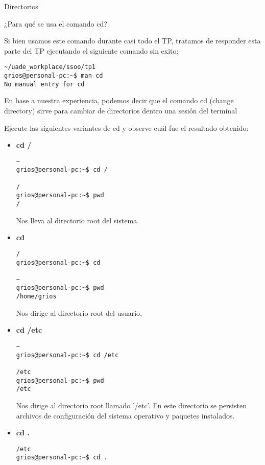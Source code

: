 \begin{section}{Directorios}

\begin{quoting}
¿Para qué se usa el comando cd?
\end{quoting}

Si bien usamos este comando durante casi todo el TP, tratamos de responder esta parte del TP ejecutando el siguiente comando sin exito:

\begin{lstlisting}[style=Ubuntu]
~/uade_workplace/ssoo/tp1
grios@personal-pc:~$ man cd
No manual entry for cd

\end{lstlisting}

En base a nuestra experiencia, podemos decir que el comando cd (change directory) sirve para cambiar de directorios dentro una sesión del terminal\\

\begin{quoting}
Ejecute las siguientes variantes de cd y observe cuál fue el resultado
obtenido:
\end{quoting}

\begin{itemize}
\item \textbf{cd /}

\begin{lstlisting}[style=Ubuntu]
~
grios@personal-pc:~$ cd /

/
grios@personal-pc:~$ pwd
/
\end{lstlisting}
Nos lleva al directorio root del sistema.

\item \textbf{cd}
\begin{lstlisting}[style=Ubuntu]
/
grios@personal-pc:~$ cd 

~
grios@personal-pc:~$ pwd
/home/grios
\end{lstlisting}
Nos dirige al directorio root del usuario,

\item \textbf{cd /etc}
\begin{lstlisting}[style=Ubuntu]
~
grios@personal-pc:~$ cd /etc

/etc
grios@personal-pc:~$ pwd
/etc
\end{lstlisting}
Nos dirige al directorio root llamado '/etc'. En este directorio se persisten archivos de configuración del sistema operativo y paquetes instalados.

\item \textbf{cd .}
\begin{lstlisting}[style=Ubuntu]
/etc
grios@personal-pc:~$ cd .


\end{lstlisting}
\end{itemize}
\end{section}
